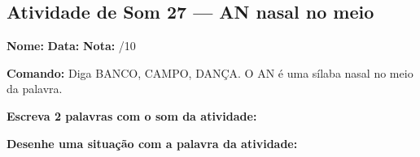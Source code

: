 \subsection{Atividade de Som 27 --- AN nasal no meio}
\begin{exercicio}



\noindent\textbf{Nome:} \underline{\hspace{3.2cm}} \quad \textbf{Data:} \underline{\hspace{1.6cm}} \quad \textbf{Nota:} \underline{\hspace{0.9cm}}/10


\noindent\textbf{Comando:} Diga BANCO, CAMPO, DANÇA. O AN é uma sílaba nasal no meio da palavra.


\begin{center}
\end{center}

\noindent\textbf{Escreva 2 palavras com o som da atividade:}

\begin{center}
  \underline{\hspace{3cm}} \quad \underline{\hspace{3cm}}
\end{center}

\noindent\textbf{Desenhe uma situação com a palavra da atividade:}

\begin{center}
\end{center}

\end{exercicio}




